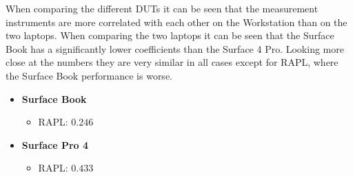 When comparing the different DUTs it can be seen that the measurement instruments are more correlated with each other on the Workstation than on the two laptops. When comparing the two laptops it can be seen that the Surface Book has a significantly lower coefficients than the Surface 4 Pro. Looking more close at the numbers they are very similar in all cases except for RAPL, where the Surface Book performance is worse.

\begin{itemize}
    \item \textbf{Surface Book}
    \begin{itemize}
        \item RAPL: $0.246$
    \end{itemize}
    \item \textbf{Surface Pro 4}
    \begin{itemize}
        \item RAPL: $0.433$
    \end{itemize}
\end{itemize}














